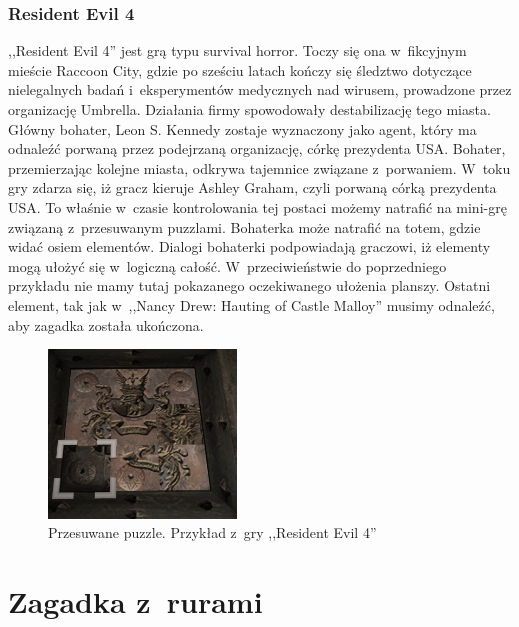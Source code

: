 \documentclass[oneside,polski,logo]{amuthesis}
\begin{document}
\subsubsection{Resident Evil 4}
\par ,,Resident Evil 4'' jest grą typu survival horror. Toczy się ona w~fikcyjnym mieście Raccoon City, gdzie po sześciu latach kończy się śledztwo dotyczące nielegalnych badań i~eksperymentów medycznych nad wirusem, prowadzone przez organizację Umbrella. Działania firmy spowodowały destabilizację tego miasta. Główny bohater, Leon S. Kennedy zostaje wyznaczony jako agent, który ma odnaleźć porwaną przez podejrzaną organizację, córkę prezydenta USA. Bohater, przemierzając kolejne miasta, odkrywa tajemnice związane z~porwaniem. W~toku gry zdarza się, iż gracz kieruje Ashley Graham, czyli porwaną córką prezydenta USA. To właśnie w~czasie kontrolowania tej postaci możemy natrafić na mini-grę związaną z~przesuwanym puzzlami. Bohaterka może natrafić na totem, gdzie widać osiem elementów. Dialogi bohaterki podpowiadają graczowi, iż elementy mogą ułożyć się w~logiczną całość. W~przeciwieństwie do poprzedniego przykładu nie mamy tutaj pokazanego oczekiwanego ułożenia planszy. Ostatni element, tak jak w~,,Nancy Drew: Hauting of Castle Malloy'' musimy odnaleźć, aby zagadka została ukończona.

\begin{figure}[h]
	\centering
	\includegraphics[width=5cm]{images/tyrek/re4.png}
	\caption{Przesuwane puzzle. Przykład z~gry ,,Resident Evil 4''}
\end{figure}


\section{Zagadka z~rurami}
\end{document}
